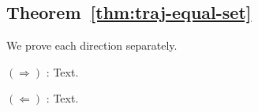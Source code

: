 \subsection{Theorem~\ref{thm:traj-equal-set}}

We prove each direction separately.

$(\Rightarrow)$ : Text.

$(\Leftarrow)$ : Text.










